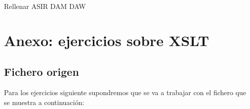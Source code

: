 \documentclass[letterpaper,10pt,spanish]{sphinxmanual}
\begin{document}
\begin{sphinxVerbatim}[commandchars=\\\{\}]
  Rellenar
      ASIR   
      DAM   
      DAW   
\end{sphinxVerbatim}


\chapter{Anexo: ejercicios sobre XSLT}
\label{\detokenize{ejercicios/xslt/anexo_ejercicios_xslt::doc}}\label{\detokenize{ejercicios/xslt/anexo_ejercicios_xslt:anexo-ejercicios-sobre-xslt}}

\section{Fichero origen}
\label{\detokenize{ejercicios/xslt/anexo_ejercicios_xslt:fichero-origen}}
Para los ejercicios siguiente supondremos que se va a trabajar con el fichero que se muestra a continuación:
\end{document}
